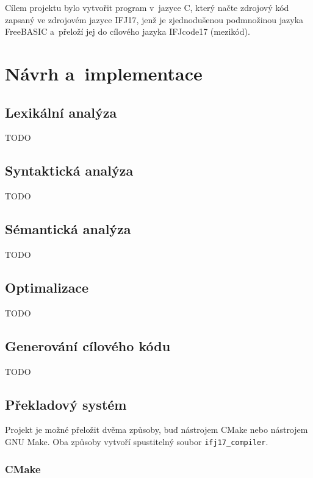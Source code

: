 \documentclass[a4paper, 11pt]{article}
\begin{document}
	Cílem projektu bylo vytvořit program v~jazyce C, který načte zdrojový kód zapsaný ve zdrojovém jazyce IFJ17,
	jenž je zjednodušenou podmnožinou jazyka FreeBASIC a~přeloží jej do cílového jazyka IFJcode17 (mezikód).


	\section{Návrh a~implementace}

	\subsection{Lexikální analýza}

	TODO


	\subsection{Syntaktická analýza}

	TODO


	\subsection{Sémantická analýza}

	TODO


	\subsection{Optimalizace}

	TODO


	\subsection{Generování cílového kódu}

	TODO


	\subsection{Překladový systém}

	Projekt je možné přeložit dvěma způsoby, buď nástrojem CMake nebo nástrojem GNU Make. Oba způsoby vytvoří
	spustitelný soubor \texttt{ifj17\_compiler}.

	\subsubsection{CMake}
\end{document}
